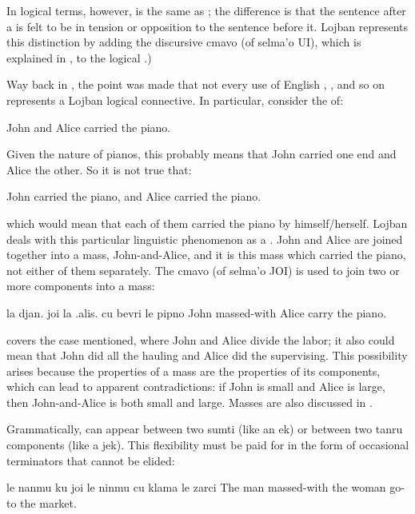 In logical terms, however,  is the same as ; the
    difference is that the sentence after a  is felt to be
    in tension or opposition to the sentence before it. Lojban
    represents this distinction by adding the discursive cmavo
     (of selma'o UI), which is explained in , to the logical .)



Way back in , the point was made
    that not every use of English , , and so
    on represents a Lojban logical connective. In particular,
    consider the  of:
\begin{example}
John and Alice carried the piano.
\end{example}

Given the nature of pianos, this probably means that John
    carried one end and Alice the other. So it is not true that:
\begin{example}
John carried the piano,\n
\T	and Alice carried the piano.
\end{example}

{\noindent}which would mean that each of them carried the piano by
    himself/herself. Lojban deals with this particular linguistic
    phenomenon as a . John and Alice are joined together
    into a mass, John-and-Alice, and it is this mass which carried
    the piano, not either of them separately. The cmavo  (of
    selma'o JOI) is used to join two or more components into a
    mass:
\begin{example}
la djan. joi la .alis. cu bevri le pipno\n
John massed-with Alice carry the piano.
\end{example}

 covers the case mentioned,
    where John and Alice divide the labor; it also could mean that
    John did all the hauling and Alice did the supervising. This
    possibility arises because the properties of a mass are the
    properties of its components, which can lead to apparent
    contradictions: if John is small and Alice is large, then
    John-and-Alice is both small and large. Masses are also
    discussed in . 

Grammatically,  can appear between two sumti (like an
    ek) or between two tanru components (like a jek). This
    flexibility must be paid for in the form of occasional
    terminators that cannot be elided:
\begin{example}
le nanmu ku joi le ninmu  cu klama le zarci\n
The man massed-with the woman go-to the market.
\end{example}

